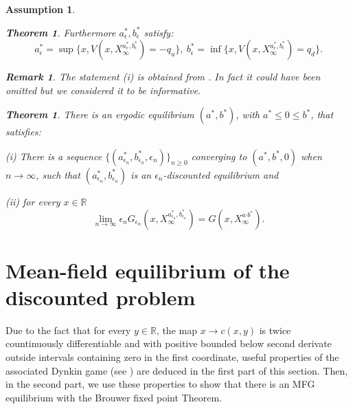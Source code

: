 \documentclass{article}
\newtheorem{theorem}[thm]{Theorem}
\newtheorem{assumptions}[thm]{Assumption}
\newtheorem{remark}[thm]{Remark}
\begin{document}
\begin{assumptions}
\begin{theorem}
%    
Furthermore $ a^{\ast}_{\epsilon},b^{\ast}_{\epsilon}$   satisfy:
%
\begin{equation*}
a^{\ast}_{\epsilon}=\sup \{x, V(x,X^{a^*_{\epsilon},b^*_{\epsilon}}_{\infty})=  -q_u \},\ 
b^{\ast}_{\epsilon}=\inf \{x, V(x,X^{a^*_{\epsilon},b^*_{\epsilon}}_{\infty})= q_d \}.    
\end{equation*}
\end{theorem}
\begin{remark}
    The statement \rm{(i)} is obtained from \cite[Theorem 1, and propositions 7 \& 8]{MO}. In fact it could have been omitted but we considered it to be informative.
\end{remark}
\begin{theorem}\label{T:ErgodicProblemsolutionMFG}
There is an ergodic equilibrium $(a^{\ast},b^{\ast})$, with $a^*\leq 0 \leq b^*$, that satisfies:
\vskip1mm\par\noindent
{\rm(i)}
There is a sequence $\lbrace (a_{\epsilon_n}^{\ast},b_{\epsilon_n}^{\ast} , \epsilon_n) \rbrace_{n \geq 0} $ converging to $ (a^{\ast},b^{\ast},0)$ when $n \to \infty$, such that $(a_{\epsilon_n}^{\ast},b^{\ast}_{\epsilon_n})$ is an $\epsilon_n$-discounted equilibrium and
\vskip1mm\par\noindent
{\rm(ii)} for every $x\in \mathbb{R}$  
$$\lim_{n \to \infty} \epsilon_n G_{\epsilon_n}(x, X^{a^*_{\epsilon_n},b^*_{\epsilon_n}}_{\infty}) = G(x,X^{a^,b^*}_{\infty}).$$
\end{theorem}



\end{assumptions}


\section{Mean-field equilibrium of the discounted problem}\label{C43:FixedpointTheorem}
Due to the fact that for every $y \in \mathbb{R}$, the map $x \rightarrow c(x,y)$ is twice countinuously differentiable and with positive bounded below second derivate outside intervals containing zero in the first coordinate, useful properties of the associated Dynkin game (see \cite{MO}) are deduced in the first part of this section. Then, in the second part, we use these properties to show that there is an MFG equilibrium with the Brouwer fixed point Theorem. 
\end{document}
